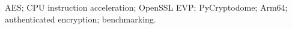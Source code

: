 AES; CPU instruction acceleration; OpenSSL EVP; PyCryptodome; Arm64; authenticated encryption; benchmarking.
